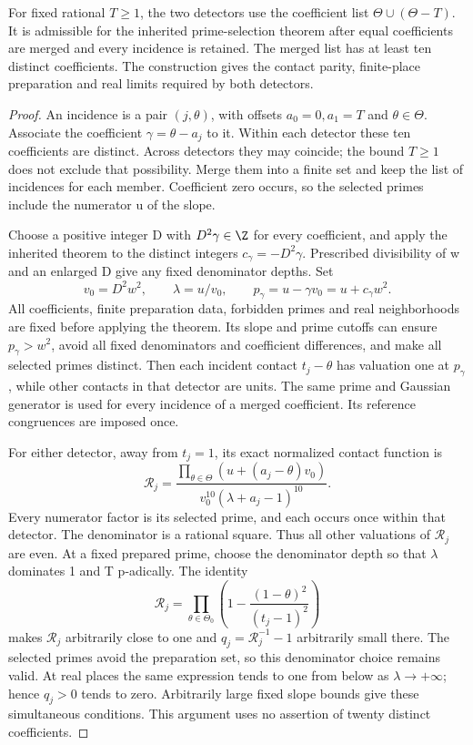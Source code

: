 \begin{lemma}
\label{q198:additive-contacts}
For fixed rational $T\ge1$, the two detectors use the coefficient
list $\Theta\cup(\Theta-T)$. It is admissible for the inherited
prime-selection theorem after equal coefficients are merged and
every incidence is retained. The merged list has at least ten
distinct coefficients. The construction gives the contact parity,
finite-place preparation and real limits required by both detectors.
\end{lemma}
\begin{proof}
An incidence is a pair $(j,\theta)$, with offsets $a_0=0,a_1=T$
and $\theta\in\Theta$. Associate the coefficient
$\gamma=\theta-a_j$ to it. Within each detector these ten
coefficients are distinct. Across detectors they may coincide;
the bound $T\ge1$ does not exclude that possibility.
Merge them into a finite set and keep the list of incidences for
each member. Coefficient zero occurs, so the selected primes include
the numerator u of the slope.

Choose a positive integer D with $D^2\gamma\in\Z$ for every
coefficient, and apply the inherited theorem to the distinct integers
$c_\gamma=-D^2\gamma$. Prescribed divisibility of w and an enlarged D
give any fixed denominator depths. Set
\[
 v_0=D^2w^2,\qquad\lambda=u/v_0,\qquad
 p_\gamma=u-\gamma v_0=u+c_\gamma w^2.
\]
All coefficients, finite preparation data, forbidden primes and real
neighborhoods are fixed before applying the theorem. Its slope and
prime cutoffs can ensure $p_\gamma>w^2$, avoid all fixed denominators
and coefficient differences, and make all selected primes distinct.
Then each incident contact $t_j-\theta$ has valuation one at
$p_\gamma$, while other contacts in that detector are units.
The same prime and Gaussian generator is used for every incidence
of a merged coefficient. Its reference congruences are imposed once.

For either detector, away from $t_j=1$, its exact normalized contact
function is
\[
 \mathcal R_j=
 \frac{\prod_{\theta\in\Theta}(u+(a_j-\theta)v_0)}
 {v_0^{10}(\lambda+a_j-1)^{10}}.
\]
Every numerator factor is its selected prime, and each occurs once
within that detector. The denominator is a rational square.
Thus all other valuations of $\mathcal R_j$ are even. At a fixed
prepared prime, choose the denominator depth so that $\lambda$
dominates 1 and T p-adically. The identity
\[
 \mathcal R_j=
 \prod_{\theta\in\Theta_0}
 \left(1-\frac{(1-\theta)^2}{(t_j-1)^2}\right)
\]
makes $\mathcal R_j$ arbitrarily close to one and
$q_j=\mathcal R_j^{-1}-1$ arbitrarily small there. The selected
primes avoid the preparation set, so this denominator choice remains
valid. At real places the same expression tends to one from below
as $\lambda\to+\infty$; hence $q_j>0$ tends to zero. Arbitrarily
large fixed slope bounds give these simultaneous conditions.
This argument uses no assertion of twenty distinct coefficients.
\end{proof}

